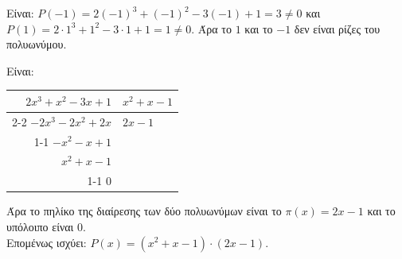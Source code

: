\begin{alist}
\item Είναι:
$P(-1) = 2(-1)^3 + (-1)^2 - 3(-1) + 1 = 3 \ne 0$ και\\
$P(1) = 2 \cdot 1^3 + 1^2 - 3 \cdot 1 + 1 = 1 \ne 0$.
Άρα το $1$ και το $-1$ δεν είναι ρίζες του πολυωνύμου.
\item Είναι:
\begin{center}
\begin{tabular}{r|l}
$2x^3 + x^2 - 3x + 1$ & $x^2 + x - 1$ \\ \cline{2-2}
$-2x^3 - 2x^2 + 2x$\phantom{ $+ 1$} & $2x - 1$ \\ \cline{1-1}
$-x^2 - x + 1$ & \\
$x^2 + x - 1$ & \\ \cline{1-1}
$0$ &
\end{tabular}
\end{center}
Άρα το πηλίκο της διαίρεσης των δύο πολυωνύμων είναι το $\pi(x) = 2x - 1$ και το υπόλοιπο είναι 0.\\
Επομένως ισχύει: $P(x) = (x^2 + x - 1) \cdot (2x - 1)$.
\end{alist}


